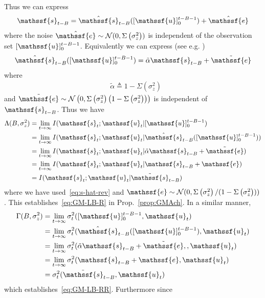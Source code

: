 \documentclass[journal, twocolumn, 10pt]{IEEEtran}
\newcommand{\cN}{{\mathcal{N}}}
\newcommand{\rve}{{\mathssf{e}}}    %
\newcommand{\rvs}{{\mathssf{s}}}    %
\newcommand{\rvu}{{\mathssf{u}}}    %
\begin{document}
{Thus we can express
\begin{align}
\rvs_{t-B} = \hat{\rvs}_{t-B} ([\rvu]_{0}^{t-B-1}) + \hat{\rve}\label{h2}
\end{align} where the noise $\hat{\rve} \sim \cN(0, \Sigma\left(\sigma^{2}_{z} \right))$ is independent of the observation set $[\rvu]_{0}^{t-B-1}$. 
Equivalently we can express (see e.g. \cite{willskyWornel03})
\begin{align}
\hat{\rvs}_{t-B}([\rvu]_{0}^{t-B-1}) = \tilde{\alpha}\rvs_{t-B} + \tilde{\rve} \label{eq:s-hat-rev}
\end{align}
where
\begin{align}
&\tilde{\alpha} \triangleq 1-\Sigma\left(\sigma^{2}_{z} \right)
\end{align}
and $\tilde{\rve} \sim \cN \left(0, \Sigma\left(\sigma^{2}_{z} \right) \left(1-\Sigma\left(\sigma^{2}_{z} \right)\right)\right)$ is independent of $\rvs_{t-B}$.
Thus we have
\begin{align}
\Lambda(B, \sigma^2_{z}) &= \lim_{t\to \infty}  I(\rvs_{t} ; \rvu_{t} | [\rvu]_{0}^{t-B-1})\notag\\
&= \lim_{t\to \infty}  I(\rvs_{t} ; \rvu_{t} | \hat{\rvs}_{t-B}([\rvu]_{0}^{t-B-1}))\notag\\
&=\lim_{t\to \infty}  I(\rvs_{t} ; \rvu_{t} | \tilde{\alpha}\rvs_{t-B} + \tilde{\rve})\notag\\
&=\lim_{t\to \infty}  I(\rvs_{t} ; \rvu_{t} | \rvs_{t-B} + {\rve})\notag\\
&=  I(\rvs_{t} ; \rvu_{t} | \tilde{\rvs}_{t-B})
\end{align}
where  we have used~\eqref{eq:s-hat-rev} and ${{\rve} \sim \cN(0, \Sigma\left(\sigma^{2}_{z} \right)/(1-\Sigma\left(\sigma^{2}_{z} \right)))}$. This establishes~\eqref{eq:GM-LB-R} in Prop.~\ref{prop:GMAch}.
In a similar manner,
\begin{align}
\Gamma(B,\sigma^{2}_{z})  &= \lim_{t\to \infty }\sigma^{2}_{t} ([\rvu]_{0}^{t-B-1}, \rvu_{t})\notag\\
& = \lim_{t\to \infty }\sigma^{2}_{t} (\hat{\rvs}_{t-B}([\rvu]_{0}^{t-B-1}), \rvu_{t})\notag\\
& = \lim_{t\to \infty }\sigma^{2}_{t} (\tilde{\alpha}{\rvs}_{t-B} + \tilde{\rve}, , \rvu_{t})\notag\\
& = \lim_{t\to \infty }\sigma^{2}_{t} ({\rvs}_{t-B}+ {{\rve}} , \rvu_{t})\notag\\
&= \sigma^{2}_{t} (\tilde{\rvs}_{t-B}, \rvu_{t})\label{h3_2}
\end{align} which establishes~\eqref{eq:GM-LB-RR}. Furthermore since
}
\end{document}
